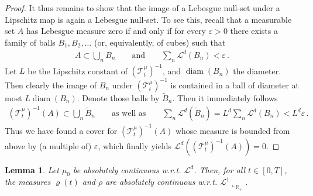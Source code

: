 \documentclass[A4paper,11pt]{article}
\newtheorem{lemma}[theorem]{Lemma}
\theoremstyle{definition}
\newcommand{\R}{\mathbb{R}}
\newcommand{\cl}{\mathcal{L}}
\newcommand{\ct}{\mathcal{T}}
\DeclareMathOperator{\diam}{diam}
\begin{document}
\begin{proof}
	It thus remains to show that the image of a Lebesgue null-set under a Lipschitz map is again a Lebesgue null-set. To see this,
	recall that a measurable set $A$ has Lebesgue measure zero if and only if for every $\varepsilon>0$ there exists a
	family of balls $B_1,B_2,\ldots$ (or, equivalently, of cubes) such that
	\begin{align*}
		A\subset\bigcup_n B_n\qquad\text{and}\qquad\sum_n\cl^d(B_n)<\varepsilon\,.
	\end{align*}
	Let $L$ be the Lipschitz constant of $(\ct^\mu_t)^{-1}$, and $\diam(B_n)$ the diameter. Then clearly the image of
	$B_n$ under $(\ct^\mu_t)^{-1}$ is contained in a ball of diameter at most $L\diam(B_n)$. Denote those balls by
	$\widetilde B_n$.
	Then it immediately follows
	\begin{align*}
		(\ct^\mu_t)^{-1}(A)\subset\bigcup_n\widetilde B_n\qquad\text{as well as}\qquad
		\sum_n\cl^d(\widetilde B_n)=L^d\sum_n\cl^d(B_n)<L^d\varepsilon\,.
	\end{align*}
	Thus we have found a cover for $(\ct^\mu_t)^{-1}(A)$ whose measure is bounded from above by (a multiple of) $\varepsilon$, which finally
	yields $\cl^d((\ct^\mu_t)^{-1}(A))=0$.
\end{proof}

\begin{lemma}\label{le-abs}
	Let $\mu_0$ be absolutely continuous w.r.t. $\cl^d$. Then, for all $t\in [0,T]$, the measures $\varrho(t)$ and $\rho$ are absolutely
	continuous w.r.t. $\cl^1\llcorner_{\R_+}$.
\end{lemma}
\end{document}
